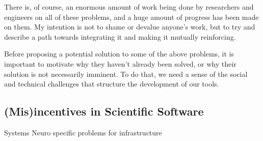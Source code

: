 \documentclass[10pt]{article}
\begin{document}
\begin{multicols}{2}
There is, of course, an enormous amount of work being done by
researchers and engineers on all of these problems, and a huge amount of
progress has been made on them. My intention is not to shame or devalue
anyone's work, but to try and describe a path towards integrating it and
making it mutually reinforcing.

Before proposing a potential solution to some of the above problems, it
is important to motivate why they haven't already been solved, or why
their solution is not necessarily imminent. To do that, we need a sense
of the social and technical challenges that structure the development of
our tools. 
\end{multicols}


\hypertarget{misincentives-in-scientific-software}{%
\subsection{(Mis)incentives in Scientific
Software}\label{misincentives-in-scientific-software}}

Systems Neuro {specific problems for infrastructure}
\end{document}
